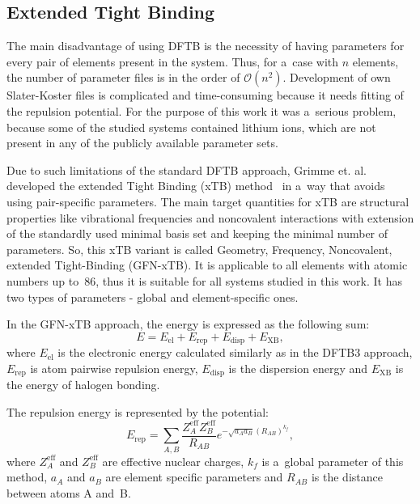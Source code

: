 \subsection{Extended Tight Binding}

The main disadvantage of using DFTB is the necessity of having parameters for every pair of elements present in the system. Thus, for a~case with $n$ elements, the number of parameter files is in the order of $\mathcal{O}(n^2)$. Development of own Slater-Koster files is complicated and time-consuming because it needs fitting of the repulsion potential. For the purpose of this work it was a~serious problem, because some of the studied systems contained lithium ions, which are not present in any of the publicly available parameter sets.

Due to such limitations of the standard DFTB approach, Grimme et. al. developed the extended Tight Binding (xTB) method~\cite{xtb} in a~way that avoids using pair-specific parameters. The main target quantities for xTB are structural properties like vibrational frequencies and noncovalent interactions with extension of the standardly used minimal basis set and keeping the minimal number of parameters. So, this xTB variant is called Geometry, Frequency, Noncovalent, extended Tight-Binding (GFN-xTB). It is applicable to all elements with atomic numbers up to~86, thus it is suitable for all systems studied in this work. It has two types of parameters - global and element-specific ones.

In the GFN-xTB approach, the energy is expressed as the following sum:
\begin{equation}
    E = E_{\text{el}} + E_{\text{rep}} + E_{\text{disp}} + E_{\text{XB}},
\end{equation}
where $E_{\text{el}}$ is the electronic energy calculated similarly as in the DFTB3 approach, $E_{\text{rep}}$ is atom pairwise repulsion energy, $E_{\text{disp}}$ is the dispersion energy and $E_{\text{XB}}$ is the energy of halogen bonding.

The repulsion energy is represented by the potential:
\begin{equation}
    E_{\text{rep}} = \sum_{A, B} \frac{Z_{A}^{\text{eff}} Z_{B}^{\text{eff}}}{R_{AB}} e^{-\sqrt{a_A a_B} \left( R_{AB} \right)^{k_f}},
\end{equation}
where $Z_A^{\text{eff}}$ and $Z_B^{\text{eff}}$ are effective nuclear charges, $k_f$ is a~global parameter of this method, $a_A$ and $a_B$ are element specific parameters and $R_{AB}$ is the distance between atoms A and~B.

